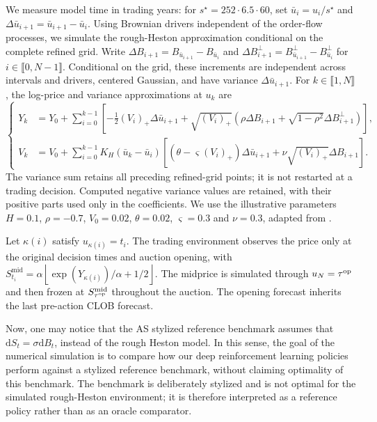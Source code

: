 \documentclass[11pt]{article}
\begin{document}
 We measure model time in trading years: for $s^\star=252\cdot6.5\cdot60$, set $\bar u_i=u_i/s^\star$ and $\Delta\bar u_{i+1}=\bar u_{i+1}-\bar u_i$. Using Brownian drivers independent of the order-flow processes, we simulate the rough-Heston approximation conditional on the complete refined grid. Write $\Delta B_{i+1}=B_{\bar u_{i+1}}-B_{\bar u_i}$ and $\Delta B_{i+1}^{\perp}=B_{\bar u_{i+1}}^{\perp}-B_{\bar u_i}^{\perp}$ for $i\in\llbracket 0,N-1\rrbracket$. Conditional on the grid, these increments are independent across intervals and drivers, centered Gaussian, and have variance $\Delta\bar u_{i+1}$. For $k\in\llbracket 1,N\rrbracket$, the log-price and variance approximations at $u_k$ are
\[
\left\{\begin{aligned}
Y_k &= Y_0+\sum_{i=0}^{k-1}\left[
-\frac12(V_i)_+\Delta\bar u_{i+1}
+\sqrt{(V_i)_+}\left(\rho\Delta B_{i+1}
+\sqrt{1-\rho^2}\Delta B_{i+1}^{\perp}\right)\right],\\
V_k &= V_0+\sum_{i=0}^{k-1}K_H(\bar u_k-\bar u_i)\left[
(\theta-\varsigma(V_i)_+)\Delta\bar u_{i+1}
+\nu\sqrt{(V_i)_+}\Delta B_{i+1}\right].
\end{aligned}\right.
\]
The variance sum retains all preceding refined-grid points; it is not restarted at a trading decision. Computed negative variance values are retained, with their positive parts used only in the coefficients. We use the illustrative parameters $H=0.1$, $\rho=-0.7$, $V_0=0.02$, $\theta=0.02$, $\varsigma=0.3$ and $\nu=0.3$, adapted from \cite{abi2019lifting}.\vspace{0.5em}

Let $\kappa(i)$ satisfy $u_{\kappa(i)}=t_i$. The trading environment observes the price only at the original decision times and auction opening, with $S_{t_i}^{\mathrm{mid}}=\alpha\left\lfloor \exp(Y_{\kappa(i)})/\alpha+1/2 \right\rfloor$. The midprice is simulated through $u_N=\tau^{\mathrm{op}}$ and then frozen at $S_{\tau^{\mathrm{op}}}^{\mathrm{mid}}$ throughout the auction. The opening forecast inherits the last pre-action CLOB forecast.\vspace{0.5em}

Now, one may notice that the AS stylized reference benchmark assumes that $\mathrm{d}S_t = \sigma \mathrm{d}B_t$, instead of the rough Heston model. In this sense, the goal of the numerical simulation is to compare how our deep reinforcement learning policies perform against a stylized reference benchmark, without claiming optimality of this benchmark. The benchmark is deliberately stylized and is not optimal for the simulated rough-Heston environment; it is therefore interpreted as a reference policy rather than as an oracle comparator.\vspace{0.5em}
\end{document}

